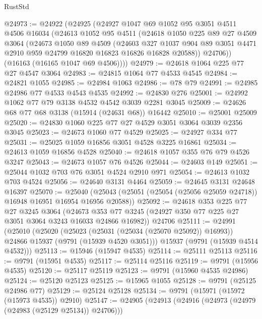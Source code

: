 \begin{lexlean}{RustStd}
\begin{coremodule}
@24973 := @24922
    (@24925
      (@24927
        @1047
        @69
        @1052
        @95
        @3051
        @4511
        @4506
        @16034
        (@24613
          @1052
          @95
          @4511
          (@24618
            @1050
            @225
            @89
            @27
            @4509
            @3064
            (@24673
              @1050
              @89
              @4509
              (@24603
                @327
                @1037
                @904
                @89
                @3051
                @4471
                @2910
                @959
                @24799
                @16820
                @16823
                @16826
                @16828
                @20588))
            @24706))
        (@16163 (@16165 @1047 @69 @4506))))
@24979 := @24618 @1064 @225 @77 @27 @4547 @3064
@24983 := @24815 @1064 @77 @4533 @4545
@24984 := @24821 @1055
@24985 := @24984 @1063
@24986 := @78 @79
@24991 := @24985 @24986 @77 @4533 @4543 @4535
@24992 := @24830 @276
@25001 := @24992 @1062 @77 @79 @3138 @4532 @4542 @3039 @2281 @3045
@25009 := @24626 @68 @77 @68 @3138 (@15914 (@24631 @68)) @16442
@25010 := @25001 @25009
@25020 := @24830 @1060 @225 @77 @27 @4529 @3051 @3064 @3039 @2356 @3045
@25023 := @24673 @1060 @77 @4529
@25025 := @24927 @334 @77
@25031 := @25025 @1059 @16856 @3051 @4528 @3225 @16861
@25034 := @24613 @1059 @16856 @4528
@25040 := @24618 @1057 @355 @76 @79 @4526 @3247
@25043 := @24673 @1057 @76 @4526
@25044 := @24603 @149
@25051 := @25044 @1032 @703 @76 @3051 @4524 @2910 @971
@25054 := @24613 @1032 @703 @4524
@25056 := @24640 @3131 @4464
@25059 := @24645 @3131 @24648 @16397
@25070 := @25040
    (@25043 (@25051 (@25054 (@25056 @25059 @24718)) @16948 @16951 @16954 @16956 @20588))
@25092 := @24618
    @353
    @225
    @77
    @27
    @3245
    @3064
    (@24673 @353 @77 @3245 (@24927 @350 @77 @225 @27 @3051 @3064 @3243 @16033 @24866 @16982))
    @24706
@25111 := @24991
    (@25010
      (@25020
        (@25023 (@25031 (@25034 (@25070 @25092)) @16993))
        @24866
        @15937
        (@9791 (@15939 @4520 @3051)))
      @15937
      (@9791 (@15939 @4514 @4532)))
@25113 := @15946 (@15947 @4535)
@25114 := @25111 @25113
@25116 := @9791 (@15951 @4535)
@25117 := @25114 @25116
@25119 := @9791 (@15956 @4535)
@25120 := @25117 @25119
@25123 := @9791 (@15960 @4535 @24986)
@25124 := @25120 @25123
@25125 := @15965 @1055
@25128 := @9791 (@25125 @24986 @77)
@25129 := @25124 @25128
@25134 := @9791 (@15971 (@15972 (@15973 @4535)) @2910)
@25147 := @24905
    (@24913
      (@24916 (@24973 (@24979 (@24983 (@25129 @25134)) @24706)))

\end{coremodule}
\end{lexlean}
